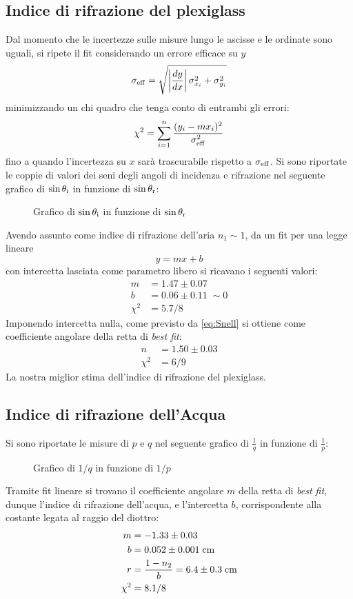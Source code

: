 \documentclass{article}[a4paper,11pt]
\begin{document}
\subsection*{Indice di rifrazione del plexiglass}
Dal momento che le incertezze sulle misure lungo le ascisse e le ordinate sono uguali, si ripete il fit considerando un errore efficace su $y$ 
\begin{equation*}
\sigma_{\rm eff} = \sqrt{\left|\frac{dy}{dx}\right|\sigma_{x_i}^2 + \sigma_{y_i}^2}
\end{equation*}
minimizzando un chi quadro che tenga conto di entrambi gli errori:
\begin{equation}\label{eq:chi_eff}
\chi^2 = \sum_{i=1}^{n} \frac{(y_i-mx_i)^2}{\sigma_{\rm eff}^2}
\end{equation}
fino a quando l'incertezza su $x$ sarà trascurabile rispetto a $\sigma_{\rm eff}$.
Si sono riportate le coppie di valori dei seni degli angoli di incidenza e rifrazione nel seguente grafico di $\sin\theta_{\rm i}$ in funzione di $\sin\theta_{\rm r}$:
\begin{figure}[!htb]
  \centering
    \scalebox{0.8}{}
  \caption{Grafico di $\sin\theta_{\rm i}$ in funzione di $\sin\theta_{\rm r}$\label{graph: plex}}
\end{figure}
Avendo assunto come indice di rifrazione dell'aria $n_1 \sim 1$, da un fit per una legge lineare $$y= mx + b$$ con intercetta lasciata come parametro libero si ricavano i seguenti valori:
\begin{align*}
m &= 1.47 \pm 0.07 \\
b &= 0.06 \pm 0.11 \; \sim 0 \\
\chi^2 &= 5.7/8
\end{align*}
Imponendo intercetta nulla, come previsto da \eqref{eq:Snell} si ottiene come coefficiente angolare della retta di \emph{best fit}:
\begin{align*}
n &= 1.50 \pm 0.03 \\
\chi^2 &= 6/9
\end{align*}
La nostra miglior stima dell'indice di rifrazione del plexiglass.
\subsection*{Indice di rifrazione dell'Acqua}
Si sono riportate le misure di $p$ e $q$ nel seguente grafico di $\frac{1}{q}$ in funzione di $\frac{1}{p}$:
\begin{figure}[!htb]
  \centering
    \scalebox{0.8}{}
  \caption{Grafico di $1/q$ in funzione di $1/p$\label{graph: water}}
\end{figure}
\noindent
Tramite fit lineare si trovano il coefficiente angolare $m$ della retta di \emph{best fit}, dunque l'indice di rifrazione dell'acqua, e l'intercetta $b$, corrispondente alla costante legata al raggio del diottro:
\begin{align*}
m &= -1.33 \pm 0.03 \\
b &= 0.052 \pm 0.001 \; \si{\/\cm} \\
r &= \frac{1-n_2}{b} = 6.4 \pm 0.3 \; \si{\cm}\\
\chi^2 &= 8.1/8
\end{align*}
\end{document}

